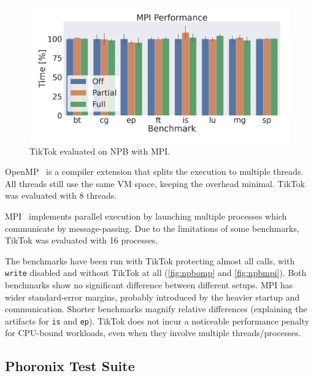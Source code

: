 \documentclass[conference]{IEEEtran}
\newcommand{\sysname}{TikTok}
\begin{document}
\begin{figure}[]
  \centering
  \includegraphics[width=\linewidth]{graphs/mpi.png}
  \caption{\sysname{} evaluated on NPB with MPI.}
  \label{fig:npbmpi}
\end{figure}


OpenMP~\cite{dagum1998openmp} is a compiler extension that splits the execution
to multiple threads. All threads still use the same VM space, keeping the
overhead minimal. \sysname{} was evaluated with 8 threads.

MPI~\cite{snir1998mpi} implements parallel execution by launching multiple
processes which communicate by message-passing. Due to the limitations of some
benchmarks, \sysname{} was evaluated with 16 processes.

The benchmarks have been run with \sysname{} protecting almost all calls, with
\texttt{write} disabled and without \sysname{} at all (\autoref{fig:npbomp} and
\autoref{fig:npbmpi}). Both benchmarks show no significant difference between
different setups. MPI has wider standard-error margins, probably introduced by
the heavier startup and communication. Shorter benchmarks magnify relative
differences (explaining the artifacts for \texttt{is} and \texttt{ep}).
\sysname{} does not incur a noticeable performance penalty for CPU-bound
workloads, even when they involve multiple threads/processes.

\subsection{Phoronix Test Suite}
\label{subsec:phoronix}
\end{document}

